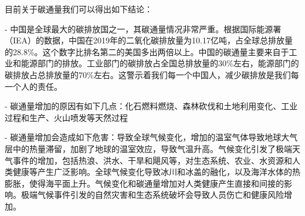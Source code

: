 \documentclass{source/Report}
\begin{document}
目前关于碳通量我们可以得出如下结论：

- 中国是全球最大的碳排放国之一，其碳通量情况非常严重。根据国际能源署（IEA）的数据，中国在2019年的二氧化碳排放量为10.17亿吨，占全球总排放量的28.8\%。这个数字比排名第二的美国多出两倍以上。中国的碳通量主要来自于工业和能源部门的排放。工业部门的碳排放占全国总排放量的30\%左右，能源部门的碳排放占总排放量的70\%左右。这警示着我们每一个中国人，减少碳排放是我们每一个人的责任。

- 碳通量增加的原因有如下几点：化石燃料燃烧、森林砍伐和土地利用变化、工业过程和生产、火山喷发等天然过程

- 碳通量增加会造成如下危害：导致全球气候变化，增加的温室气体导致地球大气层中的热量滞留，加剧了地球的温室效应，导致气温升高。气候变化引发了极端天气事件的增加，包括热浪、洪水、干旱和飓风等，对生态系统、农业、水资源和人类健康等产生广泛影响。全球气候变化导致冰川和冰盖的融化，以及海洋水体的热膨胀，使得海平面上升。气候变化和碳通量增加对人类健康产生直接和间接的影响。极端气候事件引发的自然灾害和生态系统破坏会导致人员伤亡和健康风险增加。

  
\end{document}
